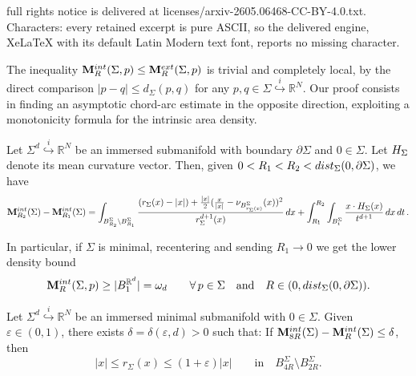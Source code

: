 \documentclass[10pt,a4paper]{amsart}
\newcommand{\R}{\mathbb{R}}
\newcommand{\ep}{\varepsilon}
\newcommand{\eps}{\varepsilon}
\begin{document}
full rights notice is delivered at licenses/arxiv-2605.06468-CC-BY-4.0.txt. Characters: every retained excerpt is pure ASCII, so the delivered engine, XeLaTeX with its default Latin Modern text font, reports no missing character.
\begin{remark}\label{rmk:trivbound}
    The inequality ${\bf M}_R^{\rm int}(\Sigma,p)\leq {\bf M}_R^{\rm ext}(\Sigma,p)$ is trivial and completely local, by the direct comparison $|p-q|\leq d_{\Sigma}(p,q)$ for any $p,q\in\Sigma\overset{i}{\hookrightarrow}\R^N$. Our proof consists in finding an asymptotic chord-arc estimate in the opposite direction, exploiting a monotonicity formula for the intrinsic area density.
\end{remark}

\begin{lemma}\label{lem:monformula}
    Let $\Sigma^d\overset{i}{\hookrightarrow}\R^N$ be an immersed submanifold with boundary $\partial\Sigma$ and $0\in\Sigma$. Let ${\rm H}_\Sigma$ denote its mean curvature vector. Then, given $0<R_1<R_2<{\rm dist}_\Sigma(0,\partial \Sigma)$, we have
    \begin{equation}\label{eq:monfor}
        {\bf M}_{R_2}^{\rm int}(\Sigma)-{\bf M}_{R_1}^{\rm int}(\Sigma)=
\int_{B_{R_2}^\Sigma\setminus B_{R_1}^\Sigma} \frac{(r_\Sigma(x)-|x|)+\frac{|x|}{2}(\frac{x}{|x|}-\nu_{B_{r_\Sigma(x)}^\Sigma}(x))^2}{r_\Sigma^{d+1}(x)}\,dx+\int_{R_1}^{R_2}\int_{B_{t}^\Sigma} \frac{x\cdot{\rm H}_\Sigma(x)}{t^{d+1}}\,dx\,dt\,.
\end{equation}
\end{lemma}

\begin{remark}\label{rmk:lowdens}
     In particular, if $\Sigma$ is minimal, recentering  and sending $R_1\to 0$ we get the lower density bound
    $${\bf M}_R^{\rm int}(\Sigma,p)\geq |B_1^{\R^d}|=\omega_d\qquad \forall\, p\in \Sigma\quad\mbox{and}\quad R\in(0,{\rm dist}_\Sigma(0,\partial\Sigma)).$$
\end{remark}

\begin{lemma}\label{lem:chordarc}
    Let $\Sigma^d\overset{i}{\hookrightarrow}\R^N$ be an immersed minimal submanifold with $0\in\Sigma$. Given $\eps\in(0,1)$, there exists $\delta=\delta(\eps,d)>0$ such that: If ${\bf M}_{8R}^{\rm int}(\Sigma)-{\bf M}_R^{\rm int}(\Sigma)\leq \delta$, then 
    $$|x|\leq r_\Sigma(x)\leq (1+\ep)|x|\qquad \mbox{in} \quad B_{4R}^\Sigma\setminus B_{2R}^\Sigma.$$
\end{lemma}
\end{document}
